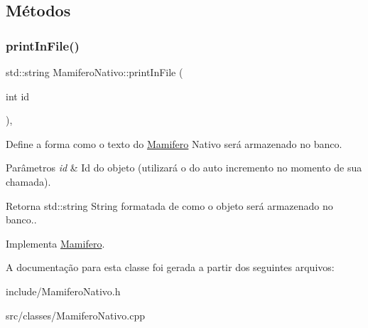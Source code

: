 \subsection{Métodos}
\mbox{\label{classMamiferoNativo_ae2f2b00cb6720cea2780ebef78be52ea}} 
\subsubsection{\texorpdfstring{print\+In\+File()}{printInFile()}}
{\footnotesize\ttfamily std\+::string Mamifero\+Nativo\+::print\+In\+File (\begin{DoxyParamCaption}\item[{int}]{id }\end{DoxyParamCaption})\hspace{0.3cm}{\ttfamily [protected]}, {\ttfamily [virtual]}}



Define a forma como o texto do \hyperlink{classMamifero}{Mamifero} Nativo será armazenado no banco. 


\begin{DoxyParams}{Parâmetros}
{\em id} & Id do objeto (utilizará o do auto incremento no momento de sua chamada). \\
\hline
\end{DoxyParams}
\begin{DoxyReturn}{Retorna}
std\+::string String formatada de como o objeto será armazenado no banco.. 
\end{DoxyReturn}


Implementa \hyperlink{classMamifero_ae91b67a8f0f508793a801aadcaa18570}{Mamifero}.



A documentação para esta classe foi gerada a partir dos seguintes arquivos\+:\begin{DoxyCompactItemize}
\item 
include/Mamifero\+Nativo.\+h\item 
src/classes/Mamifero\+Nativo.\+cpp\end{DoxyCompactItemize}
